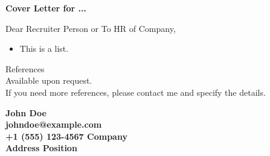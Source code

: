 \documentclass[12pt]{curve}
\begin{document}
\begin{center}
    {\normalsize\bfseries Cover Letter for ...}
\end{center}
\hrulefill

\bigbreak
\begin{center}
    Dear Recruiter Person or To HR of Company,
\end{center}

\bigbreak
\bigbreak

\lipsum[2-3]

\begin{itemize}
    \item This is a list.
\end{itemize}

References \\
Available upon request. \\
If you need more references, please contact me and specify the details.

\vfill
\hrulefill

\textbf
{%
    John Doe \\
    johndoe@example.com \\
    +1 (555) 123-4567       \hspace*{\fill} Company \\
    Address \hspace*{\fill} Position
}
\end{document}
